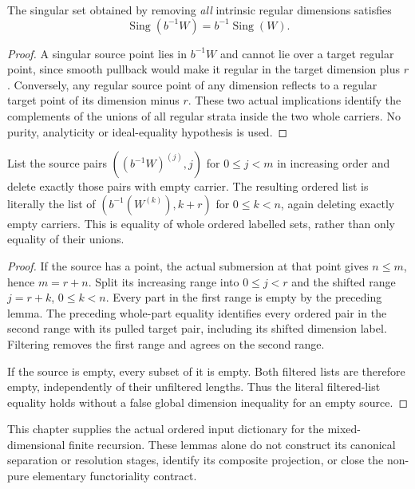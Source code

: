 \begin{lemma}
\label{hir:original-nonpure-singular-set-smooth-pullback}
\leanok
The singular set obtained by removing \emph{all} intrinsic regular
dimensions satisfies
\[
 \operatorname{Sing}(b^{-1}W)=b^{-1}\operatorname{Sing}(W).
\]
\end{lemma}
\begin{proof}
A singular source point lies in $b^{-1}W$ and cannot lie over a target
regular point, since smooth pullback would make it regular in the
target dimension plus $r$.  Conversely, any regular source point of
any dimension reflects to a regular target point of its dimension
minus $r$.  These two actual implications identify the complements
of the unions of all regular strata inside the two whole carriers.
No purity, analyticity or ideal-equality hypothesis is used.
\end{proof}

\begin{lemma}
\label{hir:original-increasing-dimension-list-smooth-pullback}
\leanok
List the source pairs $((b^{-1}W)^{(j)},j)$ for $0\le j<m$ in
increasing order and delete exactly those pairs with empty carrier.
The resulting ordered list is literally the list of
$(b^{-1}(W^{(k)}),k+r)$ for $0\le k<n$, again deleting exactly empty
carriers.  This is equality of whole ordered labelled sets, rather
than only equality of their unions.
\end{lemma}
\begin{proof}
If the source has a point, the actual submersion at that point gives
$n\le m$, hence $m=r+n$.  Split its increasing range into $0\le j<r$
and the shifted range $j=r+k$, $0\le k<n$.  Every part in the first
range is empty by the preceding lemma.  The preceding whole-part
equality identifies every ordered pair in the second range with its
pulled target pair, including its shifted dimension label.  Filtering
removes the first range and agrees on the second range.

If the source is empty, every subset of it is empty.  Both filtered
lists are therefore empty, independently of their unfiltered lengths.
Thus the literal filtered-list equality holds without a false global
dimension inequality for an empty source.
\end{proof}

\begin{remark}
This chapter supplies the actual ordered input dictionary for the
mixed-dimensional finite recursion.  These lemmas alone do not
construct its canonical separation or resolution stages, identify its
composite projection, or close the non-pure elementary functoriality
contract.
\end{remark}
